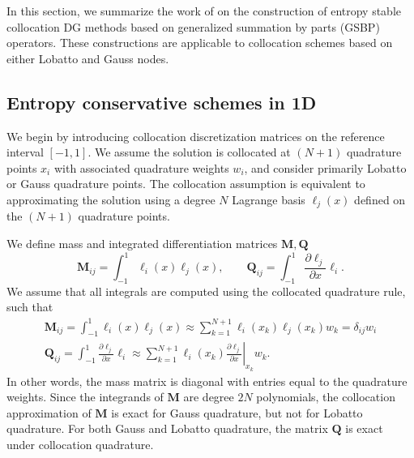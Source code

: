 \documentclass{svjour3}                     %
\newcommand{\pd}[2]{\frac{\partial#1}{\partial#2}}
\newcommand{\LRl}[1]{\left. #1 \right|}
\begin{document}
In this section, we summarize the work of \cite{chan2018efficient} on the construction of entropy stable collocation DG methods based on generalized summation by parts (GSBP) operators.  These constructions are applicable to collocation schemes based on either Lobatto and Gauss nodes.  

\subsection{Entropy conservative schemes in 1D}

We begin by introducing collocation discretization matrices on the reference interval $[-1,1]$.  We assume the solution is collocated at $(N+1)$ quadrature points $x_i$ with associated quadrature weights $w_i$, and consider primarily Lobatto or Gauss quadrature points.  The collocation assumption is equivalent to approximating the solution using a degree $N$ Lagrange basis $\ell_j(x)$ defined on the $(N+1)$ quadrature points.  

We define mass and integrated differentiation matrices $\bm{M}, \bm{Q}$
\[
\bm{M}_{ij} = \int_{-1}^1 \ell_i(x)\ell_j(x), \qquad \bm{Q}_{ij} = \int_{-1}^1 \pd{\ell_j}{x}\ell_i.
\]
We assume that all integrals are computed using the collocated quadrature rule, such that 
\begin{gather*}
\bm{M}_{ij} = \int_{-1}^1 \ell_i(x)\ell_j(x) \approx \sum_{k=1}^{N+1} \ell_i(x_k)\ell_j(x_k) w_k = \delta_{ij} w_i\\
\bm{Q}_{ij} = \int_{-1}^1 \pd{\ell_j}{x}\ell_i \approx \sum_{k=1}^{N+1} \ell_i(x_k)\LRl{\pd{\ell_j}{x}}_{x_k} w_k.  
\end{gather*}
In other words, the mass matrix is diagonal with entries equal to the quadrature weights.  Since the integrands of $\bm{M}$ are degree $2N$ polynomials, the collocation approximation of $\bm{M}$ is exact for Gauss quadrature, but not for Lobatto quadrature.  For both Gauss and Lobatto quadrature, the matrix $\bm{Q}$ is exact under collocation quadrature.
\end{document}
